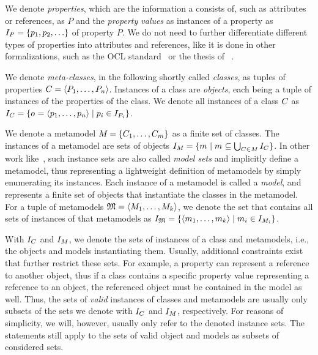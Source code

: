 We denote \emph{properties}, which are the information a \metaclass consists of, such as attributes or references, as $P$ and the \emph{property values} as instances of a property as $\instances{P} = \setted{p_1, p_2, \dots}$ of property $P$. 
We do not need to further differentiate different types of properties into attributes and references, like it is done in other formalizations, such as the \gls{OCL} standard~\cite[A.1]{ocl} or the thesis of \citeauthor{kramer2017a}~\cite[2.3.2]{kramer2017a}.

We denote \emph{meta-classes}, in the following shortly called \emph{classes}, as tuples of properties $C_{} = \langle P_1, \dots, P_n \rangle$. 
Instances of a class are \emph{objects}, each being a tuple of instances of the properties of the class.
We denote all instances of a class $C_{}$ as $I_{C_{}} = \{ o_{} = \langle p_1, \dots, p_n \rangle \mid p_i \in I_{P_i} \}$.

We denote a metamodel $M_{} = \{ C_{1}, \dots, C_{m} \}$ as a finite set of classes.
The instances of a metamodel are sets of objects $I_{M_{}} = \{ m_{} \mid m_{} \subseteq \bigcup_{C_{} \in M_{}} I_{C_{}} \}$.
In other work like~\cite{stevens2020BidirectionalTransformationLarge-SoSym}, such instance sets are also called \emph{model sets} and implicitly define a metamodel, thus representing a lightweight definition of metamodels by simply enumerating its instances.
Each instance of a metamodel is called a \emph{model}, and represents a finite set of objects that instantiate the classes in the metamodel.
For a tuple of metamodels $\mathfrak{M} = \langle M_{1}, \dots, M_{k} \rangle$, we denote the set that contains all sets of instances of that metamodels as $I_{\mathfrak{M}} = \{  \langle m_{1}, \dots, m_{k} \rangle \mid m_{i} \in I_{M_{i}} \}$.

With $I_{C_{}}$ and $I_{M_{}}$, we denote the sets of instances of a class and metamodels, i.e., the objects and models instantiating them.
Usually, additional constraints exist that further restrict these sets.
For example, a property can represent a reference to another object, thus if a class contains a specific property value representing a reference to an object, the referenced object must be contained in the model as well.
Thus, the sets of \emph{valid} instances of classes and metamodels are usually only subsets of the sets we denote with $I_{C_{}}$ and $I_{M_{}}$, respectively.
For reasons of simplicity, we will, however, usually only refer to the denoted instance sets.
The statements still apply to the sets of valid object and models as subsets of considered sets.

